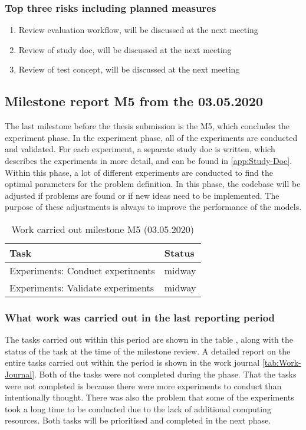 \subsubsection{Top three risks including planned measures}
\begin{enumerate}
    \setlength\itemsep{0em}
    \item Review evaluation workflow, will be discussed at the next meeting
    \item Review of study doc, will be discussed at the next meeting
    \item Review of test concept, will be discussed at the next meeting 
\end{enumerate}

\subsection{Milestone report M5 from the 03.05.2020}
The last milestone before the thesis submission is the M5, which concludes the experiment phase. In the experiment phase, all of the experiments are conducted and validated. For each experiment, a separate study doc is written, which describes the experiments in more detail, and can be found in \ref{app:Study-Doc}. Within this phase, a lot of different experiments are conducted to find the optimal parameters for the problem definition. In this phase, the codebase will be adjusted if problems are found or if new ideas need to be implemented. The purpose of these adjustments is always to improve the performance of the models.
\begin{table}[htbp]
    \centering
    \caption{Work carried out milestone M5 (03.05.2020)}
	\label{tab:Work-Carried-Out-M5}
    \begin{tabular}{p{} | p{}}
        \toprule
        \textbf{Task} & \textbf{Status} \\ 
        \midrule[1pt]
        Experiments: Conduct experiments & midway \\
        \hline
        Experiments: Validate experiments & midway \\
        \bottomrule
    \end{tabular}
\end{table}

\subsubsection{What work was carried out in the last reporting period}
The tasks carried out within this period are shown in the table , along with the status of the task at the time of the milestone review. A detailed report on the entire tasks carried out within the period is shown in the work journal \ref{tab:Work-Journal}. Both of the tasks were not completed during the phase. That the tasks were not completed is because there were more experiments to conduct than intentionally thought. There was also the problem that some of the experiments took a long time to be conducted due to the lack of additional computing resources. Both tasks will be prioritised and completed in the next phase. 


